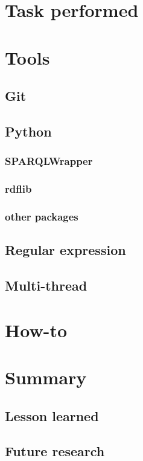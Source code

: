 \documentclass[12pt]{cls}
\begin{document}
\chapter{Task performed}
\chapter{Tools}

\section{Git}

\section{Python}

\subsection{SPARQLWrapper}

\subsection{rdflib}

\subsection{other packages}

\section{Regular expression}

\section{Multi-thread}

\chapter{How-to}

\chapter{Summary}
\section{Lesson learned}
\section{Future research}
\end{document}
